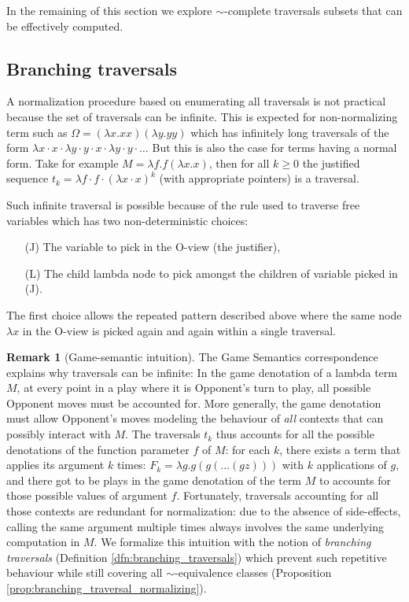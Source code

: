 \documentclass{article}
\theoremstyle{definition}
\newtheorem{remark}{Remark}[section]
\begin{document}
In the remaining of this section we explore $\sim$-complete traversals subsets that can be effectively computed.


\subsection{Branching traversals}

A normalization procedure based on enumerating all traversals is not practical because the set of traversals can be infinite. This is expected for non-normalizing term such as $\Omega = (\lambda x. x x)(\lambda y. y y)$ which has infinitely long traversals of the form $\lambda x \cdot x \cdot \lambda y \cdot y \cdot x \cdot \lambda y \cdot y \cdot \ldots$ But this is also the case for terms having a normal form. Take for example $M = \lambda f . f (\lambda x. x)$, then for all $k\geq0$ the justified sequence $t_k = \lambda f \cdot f \cdot (\lambda x \cdot  x)^k$ (with appropriate pointers) is a traversal.

Such infinite traversal is possible because of the  rule used to traverse free variables which has two non-deterministic choices:
\begin{itemize}
\item[(J)] The variable to pick in the O-view (the justifier),
\item[(L)] The child lambda node to pick amongst the children of variable picked in (J).
\end{itemize}
The first choice allows the repeated pattern described above where the same node $\lambda x$ in the O-view is picked again and again within a single traversal.

\begin{remark}[Game-semantic intuition]
The Game Semantics correspondence explains why traversals can be infinite: In the game denotation of a lambda term $M$, at every point in a play where it is Opponent's turn to play, all possible Opponent moves must be accounted for. More generally, the game denotation must allow Opponent's moves modeling the behaviour of \emph{all} contexts that can possibly interact with $M$. The traversals $t_k$ thus accounts for all the possible denotations of the function parameter $f$ of $M$: for each $k$, there exists a term that applies its argument $k$ times: $F_k = \lambda g . g (g ( \ldots (g z)))$ with $k$ applications of $g$, and there got to be plays in the game denotation of the term $M$ to accounts for those possible values of argument $f$. Fortunately, traversals accounting for all those contexts are redundant for normalization: due to the absence of side-effects, calling the same argument multiple times always involves the same underlying computation in $M$. We formalize this intuition with the notion of \emph{branching traversals} (Definition \ref{dfn:branching_traversals})  which prevent such repetitive behaviour while still covering all $\sim$-equivalence classes (Proposition \ref{prop:branching_traversal_normalizing}).
\end{remark}
\end{document}
